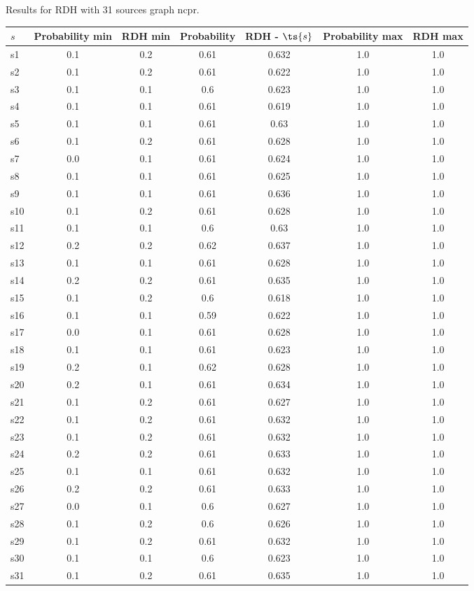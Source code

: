 \documentclass{article}
\begin{document}
\noindent Results for RDH with 31 sources graph ncpr.

\noindent\begin{tabular}{|l|c|c|c|c|c|c|}
\hline
$s$& Probability min & RDH min & Probability & RDH - $\ts{s}$ & Probability max & RDH max\\
\hline
s1 &0.1 & 0.2 & 0.61 & 0.632 & 1.0 & 1.0\\
\hline
s2 &0.1 & 0.2 & 0.61 & 0.622 & 1.0 & 1.0\\
\hline
s3 &0.1 & 0.1 & 0.6 & 0.623 & 1.0 & 1.0\\
\hline
s4 &0.1 & 0.1 & 0.61 & 0.619 & 1.0 & 1.0\\
\hline
s5 &0.1 & 0.1 & 0.61 & 0.63 & 1.0 & 1.0\\
\hline
s6 &0.1 & 0.2 & 0.61 & 0.628 & 1.0 & 1.0\\
\hline
s7 &0.0 & 0.1 & 0.61 & 0.624 & 1.0 & 1.0\\
\hline
s8 &0.1 & 0.1 & 0.61 & 0.625 & 1.0 & 1.0\\
\hline
s9 &0.1 & 0.1 & 0.61 & 0.636 & 1.0 & 1.0\\
\hline
s10 &0.1 & 0.2 & 0.61 & 0.628 & 1.0 & 1.0\\
\hline
s11 &0.1 & 0.1 & 0.6 & 0.63 & 1.0 & 1.0\\
\hline
s12 &0.2 & 0.2 & 0.62 & 0.637 & 1.0 & 1.0\\
\hline
s13 &0.1 & 0.1 & 0.61 & 0.628 & 1.0 & 1.0\\
\hline
s14 &0.2 & 0.2 & 0.61 & 0.635 & 1.0 & 1.0\\
\hline
s15 &0.1 & 0.2 & 0.6 & 0.618 & 1.0 & 1.0\\
\hline
s16 &0.1 & 0.1 & 0.59 & 0.622 & 1.0 & 1.0\\
\hline
s17 &0.0 & 0.1 & 0.61 & 0.628 & 1.0 & 1.0\\
\hline
s18 &0.1 & 0.1 & 0.61 & 0.623 & 1.0 & 1.0\\
\hline
s19 &0.2 & 0.1 & 0.62 & 0.628 & 1.0 & 1.0\\
\hline
s20 &0.2 & 0.1 & 0.61 & 0.634 & 1.0 & 1.0\\
\hline
s21 &0.1 & 0.2 & 0.61 & 0.627 & 1.0 & 1.0\\
\hline
s22 &0.1 & 0.2 & 0.61 & 0.632 & 1.0 & 1.0\\
\hline
s23 &0.1 & 0.2 & 0.61 & 0.632 & 1.0 & 1.0\\
\hline
s24 &0.2 & 0.2 & 0.61 & 0.633 & 1.0 & 1.0\\
\hline
s25 &0.1 & 0.1 & 0.61 & 0.632 & 1.0 & 1.0\\
\hline
s26 &0.2 & 0.2 & 0.61 & 0.633 & 1.0 & 1.0\\
\hline
s27 &0.0 & 0.1 & 0.6 & 0.627 & 1.0 & 1.0\\
\hline
s28 &0.1 & 0.2 & 0.6 & 0.626 & 1.0 & 1.0\\
\hline
s29 &0.1 & 0.2 & 0.61 & 0.632 & 1.0 & 1.0\\
\hline
s30 &0.1 & 0.1 & 0.6 & 0.623 & 1.0 & 1.0\\
\hline
s31 &0.1 & 0.2 & 0.61 & 0.635 & 1.0 & 1.0\\
\hline
\end{tabular}\\
\end{document}

